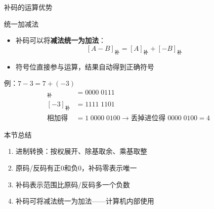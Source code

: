 \documentclass[10pt, aspectratio=169]{beamer}
\begin{document}
\begin{frame}{补码的运算优势}
    \begin{block}{统一加减法}
        \begin{itemize}
            \item 补码可以将\textbf{减法统一为加法}：
            \[
                [A - B]_{\text{补}} = [A]_{\text{补}} + [-B]_{\text{补}}
            \]
            \item 符号位直接参与运算，结果自动得到正确符号
        \end{itemize}
    \end{block}
    \vspace{0.3em}
    \begin{exampleblock}{例：$7 - 3 = 7 + (-3)$}
        \begin{align*}
            [7]_{\text{补}} &= 0000\;0111 \\
            [-3]_{\text{补}} &= 1111\;1101 \\
            \text{相加得} &= 1\;0000\;0100 \to \text{丢掉进位得 } 0000\;0100 = 4
        \end{align*}
    \end{exampleblock}
\end{frame}

\begin{frame}{本节总结}
    \begin{enumerate}
        \item 进制转换：按权展开、除基取余、乘基取整
        \item 原码/反码有正0和负0，补码零表示唯一
        \item 补码表示范围比原码/反码多一个负数
        \item 补码可将减法统一为加法——计算机内部使用
    \end{enumerate}
\end{frame}
\end{document}
